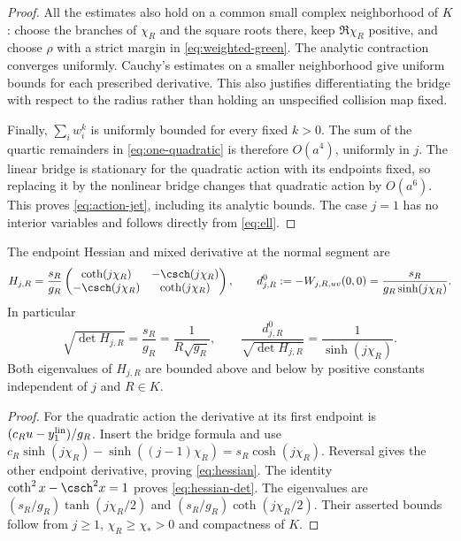 \begin{proof}
All the estimates also hold on a common small complex neighborhood of
$K$: choose the branches of $\chi_R$ and the square roots there, keep
$\Re\chi_R$ positive, and choose $\rho$ with a strict margin in
\eqref{eq:weighted-green}. The analytic contraction converges uniformly.
Cauchy's estimates on a smaller neighborhood give uniform bounds for
each prescribed derivative. This also justifies differentiating the
bridge with respect to the radius rather than holding an unspecified
collision map fixed.

Finally, $\sum_iw_i^k$ is uniformly bounded for every fixed $k>0$.
The sum of the quartic remainders in \eqref{eq:one-quadratic} is therefore
$O(a^4)$, uniformly in $j$. The linear bridge is stationary for the
quadratic action with its endpoints fixed, so replacing it by the
nonlinear bridge changes that quadratic action by $O(a^6)$.
This proves \eqref{eq:action-jet}, including its analytic bounds.
The case $j=1$ has no interior variables and follows directly from
\eqref{eq:ell}.
\end{proof}

\begin{lemma}\label{lem:hessian}
The endpoint Hessian and mixed derivative at the normal segment are
\begin{equation}\label{eq:hessian}
 H_{j,R}=\frac{s_R}{g_R}
 \begin{pmatrix}\coth(j\chi_R)&-\csch(j\chi_R)\\
                -\csch(j\chi_R)&\coth(j\chi_R)\end{pmatrix},
 \qquad
 d^0_{j,R}:=-W_{j,R,uv}(0,0)=\frac{s_R}{g_R\sinh(j\chi_R)}.
\end{equation}
In particular
\begin{equation}\label{eq:hessian-det}
 \sqrt{\det H_{j,R}}=\frac{s_R}{g_R}=\frac1{R\sqrt{g_R}},
 \qquad
 \frac{d^0_{j,R}}{\sqrt{\det H_{j,R}}}=\frac1{\sinh(j\chi_R)}.
\end{equation}
Both eigenvalues of $H_{j,R}$ are bounded above and below by positive
constants independent of $j$ and $R\in K$.
\end{lemma}
\begin{proof}
For the quadratic action the derivative at its first endpoint is
$(c_Ru-y_1^{\rm lin})/g_R$. Insert the bridge formula and use
$c_R\sinh(j\chi_R)-\sinh((j-1)\chi_R)
=s_R\cosh(j\chi_R)$. Reversal gives the other endpoint derivative,
proving \eqref{eq:hessian}. The identity
$\coth^2x-\csch^2x=1$ proves \eqref{eq:hessian-det}.
The eigenvalues are
$(s_R/g_R)\tanh(j\chi_R/2)$ and
$(s_R/g_R)\coth(j\chi_R/2)$. Their asserted bounds follow from
$j\ge1$, $\chi_R\ge\chi_*>0$ and compactness of $K$.
\end{proof}

